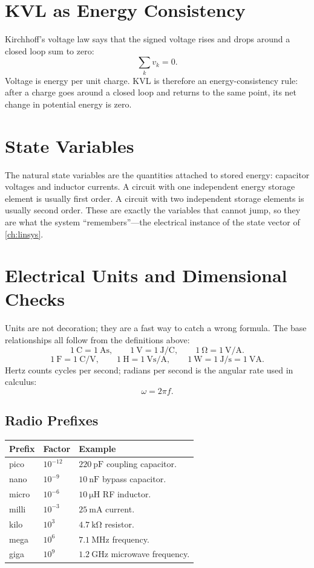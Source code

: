 \section{KVL as Energy Consistency}
Kirchhoff's voltage law says that the signed voltage rises and drops around a
closed loop sum to zero:
\[
\sum_k v_k=0.
\]
Voltage is energy per unit charge. KVL is therefore an energy-consistency rule:
after a charge goes around a closed loop and returns to the same point, its net
change in potential energy is zero.

\section{State Variables}
The natural state variables are the quantities attached to stored energy:
capacitor voltages and inductor currents. A circuit with one independent energy
storage element is usually first order. A circuit with two independent storage
elements is usually second order. These are exactly the variables that cannot jump,
so they are what the system ``remembers''---the electrical instance of the state
vector of \cref{ch:linsys}.

\section{Electrical Units and Dimensional Checks}
Units are not decoration; they are a fast way to catch a wrong formula. The base
relationships all follow from the definitions above:
\[
\SI{1}{\coulomb}=\SI{1}{\ampere\second},
\qquad
\SI{1}{\volt}=\SI{1}{\joule\per\coulomb},
\qquad
\SI{1}{\ohm}=\SI{1}{\volt\per\ampere}.
\]
\[
\SI{1}{\farad}=\SI{1}{\coulomb\per\volt},
\qquad
\SI{1}{\henry}=\SI{1}{\volt\second\per\ampere},
\qquad
\SI{1}{\watt}=\SI{1}{\joule\per\second}=\SI{1}{\volt\ampere}.
\]
Hertz counts cycles per second; radians per second is the angular rate used in
calculus:
\[
\omega=2\pi f.
\]

\subsection{Radio Prefixes}
\begin{tabularx}{\textwidth}{@{}L{0.2\textwidth}L{0.2\textwidth}Y@{}}
\toprule
Prefix & Factor & Example \\
\midrule
pico & \(10^{-12}\) & \(\SI{220}{\pico\farad}\) coupling capacitor. \\
nano & \(10^{-9}\) & \(\SI{10}{\nano\farad}\) bypass capacitor. \\
micro & \(10^{-6}\) & \(\SI{10}{\micro\henry}\) RF inductor. \\
milli & \(10^{-3}\) & \(\SI{25}{\milli\ampere}\) current. \\
kilo & \(10^{3}\) & \(\SI{4.7}{\kilo\ohm}\) resistor. \\
mega & \(10^{6}\) & \(\SI{7.1}{\mega\hertz}\) frequency. \\
giga & \(10^{9}\) & \(\SI{1.2}{\giga\hertz}\) microwave frequency. \\
\bottomrule
\end{tabularx}

